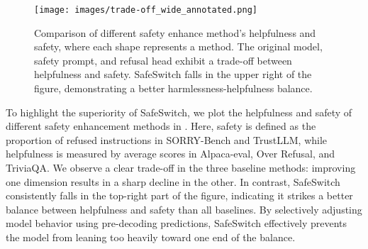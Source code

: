 \begin{figure}[htbp]
    \centering
    \texttt{[image: images/trade-off\_wide\_annotated.png]}
    \caption{Comparison of different safety enhance method's helpfulness and safety, where each shape represents a method. The original model, safety prompt, and refusal head exhibit a trade-off between helpfulness and safety. SafeSwitch falls in the upper right of the figure, demonstrating a better harmlessness-helpfulness balance.}
    \label{fig:tradeoff}
\end{figure}

To highlight the superiority of SafeSwitch, we plot the helpfulness and safety of different safety enhancement methods in . Here, safety is defined as the proportion of refused instructions in SORRY-Bench and TrustLLM, while helpfulness is measured by average scores in Alpaca-eval, Over Refusal, and TriviaQA. We observe a clear trade-off in the three baseline methods: improving one dimension results in a sharp decline in the other. In contrast, SafeSwitch consistently falls in the top-right part of the figure, indicating it strikes a better balance between helpfulness and safety than all baselines. By selectively adjusting model behavior using pre-decoding predictions, SafeSwitch effectively prevents the model from leaning too heavily toward one end of the balance.






